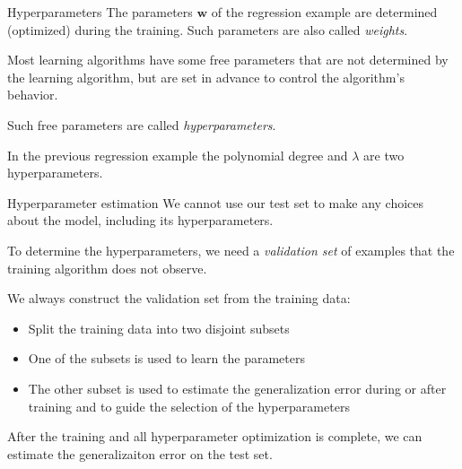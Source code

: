 \documentclass[dvipsnames]{beamer}
\begin{document}
\begin{frame}{Hyperparameters}
	The parameters $\mathbf{w}$ of the regression example are determined (optimized) during the training. Such parameters are also called \emph{weights}. %
	
	Most learning algorithms have some free parameters that are not determined by the learning algorithm, but are set in advance to control the algorithm's behavior. %

	Such free parameters are called \emph{hyperparameters}.

	In the previous regression example the polynomial degree and $\lambda$ are two hyperparameters.

\end{frame}

		
		\begin{frame}{Hyperparameter estimation}
			We cannot use our test set to make any choices about the model, including its hyperparameters. %
			
			To determine the hyperparameters, we need a \emph{validation set} of examples that the training algorithm does not observe. %
			
			We always construct the validation set from the training data:
			\begin{itemize}
				\item Split the training data into two disjoint subsets %
				\item One of the subsets is used to learn the parameters %
				\item The other subset is used to estimate the generalization error during or after training and to guide the selection of the hyperparameters %
			\end{itemize}
			
			After the training and all hyperparameter optimization is complete, we can estimate the generalizaiton error on the test set.
    \end{frame}
		
\end{document}
